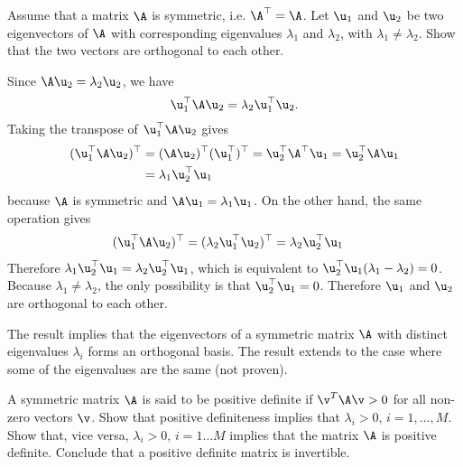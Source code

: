 
\label{ex:eigenvalue-decomposition-symmetric-matrices}
\begin{exenumerate}
\item Assume that a matrix $\A$ is symmetric, i.e. $\A^\top=\A$. Let $\u_1$ and
  $\u_2$ be two eigenvectors of $\A$ with corresponding eigenvalues $\lambda_1$
  and $\lambda_2$, with $\lambda_1 \neq \lambda_2$. Show that the two vectors
  are orthogonal to each other.

  \begin{solution}
    Since $\A\u_2 = \lambda_2\u_2$, we have
    \begin{equation}
      \u_1^\top \A\u_2 = \lambda_2\u_1^\top\u_2.
    \end{equation}
    Taking the transpose of $\u_1^\top \A\u_2$ gives
    \begin{align}
      (\u_1^\top \A\u_2)^\top &= (\A\u_2)^\top(\u_1^\top)^\top = \u_2^\top \A^\top \u_1 = \u_2^\top \A\u_1 \\
                              & = \lambda_1\u_2^\top\u_1
    \end{align}
    because $\A$ is symmetric and $\A \u_1 = \lambda_1 \u_1$. On the other hand, the same operation gives
    \begin{align}
      (\u_1^\top \A\u_2)^\top &= (\lambda_2\u_1^\top\u_2)^\top = \lambda_2\u_2^\top\u_1
    \end{align}
    Therefore $\lambda_1\u_2^\top\u_1 = \lambda_2\u_2^\top\u_1$, which is equivalent to $\u_2^\top\u_1(\lambda_1 - \lambda_2) = 0$. Because
    $\lambda_1 \neq \lambda_2$, the only possibility is that
    $\u_2^\top\u_1 = 0$. Therefore $\u_1$ and $\u_2$ are orthogonal to each other.

    The result implies that the eigenvectors of a symmetric matrix $\A$ with
    distinct eigenvalues $\lambda_i$ forms an orthogonal basis. The result
    extends to the case where some of the eigenvalues are the same (not proven).


  \end{solution}

\item A symmetric matrix $\A$ is said to be positive definite if $\v^T\A\v>0$
  for all non-zero vectors $\v$. Show that positive definiteness implies that
  $\lambda_i>0$, $i=1,\ldots, M$. Show that, vice versa, $\lambda_i>0$,
  $i=1 \ldots M$ implies that the matrix $\A$ is positive definite. Conclude
  that a positive definite matrix is invertible.


\end{exenumerate}
